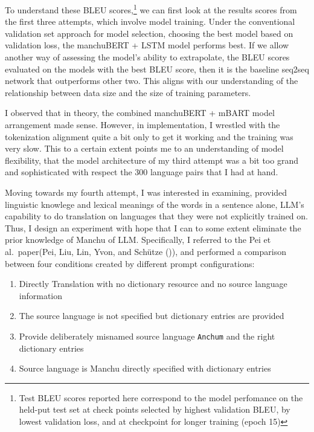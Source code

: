 \documentclass[
  letterpaper,
  DIV=11,
  numbers=noendperiod]{scrartcl}
\providecommand{\tightlist}{%
  \setlength{\itemsep}{0pt}\setlength{\parskip}{0pt}}\usepackage{longtable,booktabs,array}
\begin{document}
To understand these BLEU scores,\footnote{Test BLEU scores reported here
  correspond to the model perfomance on the held-put test set at check
  points selected by highest validation BLEU, by lowest validation loss,
  and at checkpoint for longer training (epoch 15)} we can first look at
the results scores from the first three attempts, which involve model
training. Under the conventional validation set approach for model
selection, choosing the best model based on validation loss, the
manchuBERT + LSTM model performs best. If we allow another way of
assessing the model's ability to extrapolate, the BLEU scores evaluated
on the models with the best BLEU score, then it is the baseline seq2seq
network that outperforms other two. This aligns with our understanding
of the relationship between data size and the size of training
parameters.

I observed that in theory, the combined manchuBERT + mBART model
arrangement made sense. However, in implementation, I wrestled with the
tokenization alignment quite a bit only to get it working and the
training was very slow. This to a certain extent points me to an
understanding of model flexibility, that the model architecture of my
third attempt was a bit too grand and sophisticated with respect the 300
language pairs that I had at hand.

Moving towards my fourth attempt, I was interested in examining,
provided linguistic knowlege and lexical meanings of the words in a
sentence alone, LLM's capability to do translation on languages that
they were not explicitly trained on. Thus, I design an experiment with
hope that I can to some extent eliminate the prior knowledge of Manchu
of LLM. Specifically, I referred to the Pei et al.~paper(Pei, Liu, Lin,
Yvon, and Schütze
()),
and performed a comparison between four conditions created by different
prompt configurations:

\begin{enumerate}
\def\labelenumi{\arabic{enumi}.}
\tightlist
\item
  Directly Translation with no dictionary resource and no source
  language information
\item
  The source language is not specified but dictionary entries are
  provided
\item
  Provide deliberately misnamed source language \texttt{Anchum} and the
  right dictionary entries
\item
  Source language is Manchu directly specified with dictionary entries
\end{enumerate}
\end{document}
